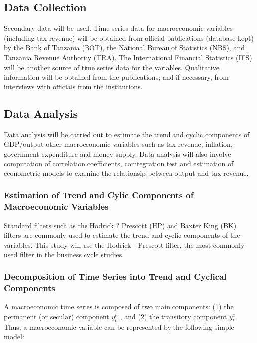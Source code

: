 \documentclass[12pt,a4paper,final]{article}
\begin{document}
\subsection{Data Collection}

Secondary data will be used. Time series data for macroeconomic variables (including tax revenue) will be obtained from official publications (database kept) by the Bank of Tanzania (BOT), the National Bureau of Statistics (NBS), and Tanzania Revenue Authority (TRA).  The International Financial Statistics (IFS) will be another source of time series data for the variables.  Qualitative information will be obtained from the publications; and if necessary, from interviews with officials from the institutions. 

\subsection{Data Analysis}

Data analysis will be carried out to estimate the trend and cyclic components of GDP/output other macroeconomic variables such as tax revenue, inflation, government expenditure and money supply. Data analysis will also involve computation of correlation coefficients, cointegration test and estimation of econometric models to examine the relationsip between output and tax revenue.

\subsubsection{Estimation of Trend and Cylic Components of Macroeconomic Variables}

Standard filters such as the Hodrick ? Prescott (HP) and Baxter King (BK) filters are commonly used to estimate the trend and cyclic components of the variables.  This study will use the Hodrick - Prescott filter, the most commonly used filter in the business cycle studies.

\subsubsection*{Decomposition of Time Series into Trend and Cyclical Components}

A macroeconomic time series   is composed of two main components: (1) the permanent (or secular) component $y_t^p$ , and (2) the transitory component  $y_t^c$. Thus, a macroeconomic variable can be represented by the following simple model:
\end{document}
